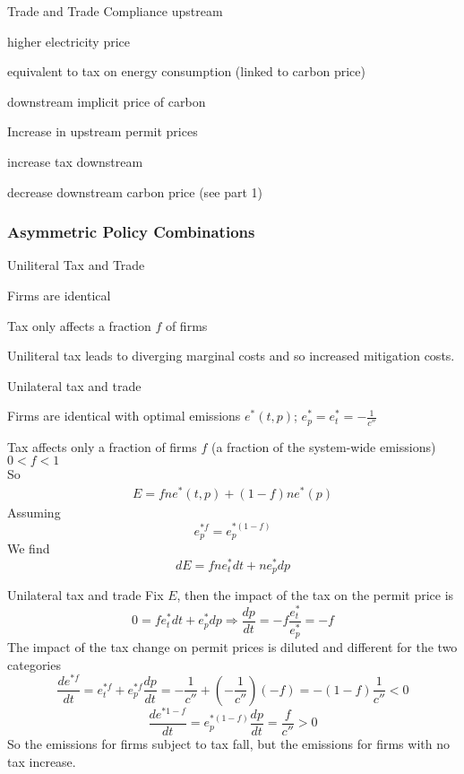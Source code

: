 
{Trade and Trade}
Compliance upstream


	 higher electricity price

	 equivalent to tax on energy consumption (linked to carbon price)

	 downstream implicit price of carbon


Increase in upstream permit prices


	 increase tax downstream

	 decrease downstream carbon price (see part 1)


\subsubsection{Asymmetric Policy Combinations}

{Uniliteral Tax and Trade}


	Firms are identical

	Tax only affects a fraction $f$ of firms

	Uniliteral tax leads to diverging marginal costs and so increased mitigation costs.


{Unilateral tax and trade}


	 Firms are identical with optimal emissions $e^*(t,p)$; $e^*_p = e^*_t = -\frac{1}{c''}$

	 Tax affects only a fraction of firms $f$ (a fraction of the system-wide emissions) $0 < f < 1$ \\
 So
\begin{align}
E = fne^*(t,p)+(1-f)ne^*(p)
\end{align}
Assuming
\[
e^{*f}_p = e^{*(1-f)}_p
\]
We find
\[
dE = fne^*_tdt+ne^*_pdp
\]



{Unilateral tax and trade}
Fix $E$, then the impact of the tax on the permit price is
\[
0 =  fe^*_tdt+e^*_pdp \Rightarrow \frac{dp}{dt} = -f \frac{e^*_t}{e^*_p} = -f
\]
The impact of the tax change on permit prices is diluted and different for the two categories
\[
\frac{de^{*f}}{dt} = e^{*f}_t + e^{*f}_p \frac{dp}{dt} = -\frac{1}{c''} + (-\frac{1}{c''})(-f) = -(1-f)\frac{1}{c''} < 0
\]
\[
\frac{de^{*1-f}}{dt} = e^{*(1-f)}_p\frac{dp}{dt} = \frac{f}{c''} > 0
\]
So the emissions for firms subject to tax fall, but the emissions for firms with no tax increase.

